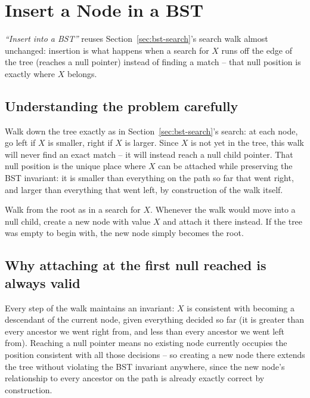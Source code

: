 \section{Insert a Node in a BST}
\label{sec:bst-insert}


\begin{patternbox}
\emph{``Insert into a BST''} reuses Section~\ref{sec:bst-search}'s
search walk almost unchanged: insertion is what happens when a search for
$X$ runs off the edge of the tree (reaches a null pointer) instead of
finding a match -- that null position is exactly where $X$ belongs.
\end{patternbox}

\subsection*{Understanding the problem carefully}

Walk down the tree exactly as in Section~\ref{sec:bst-search}'s search:
at each node, go left if $X$ is smaller, right if $X$ is larger. Since
$X$ is not yet in the tree, this walk will never find an exact match --
it will instead reach a null child pointer. That null position is the
unique place where $X$ can be attached while preserving the BST
invariant: it is smaller than everything on the path so far that went
right, and larger than everything that went left, by construction of the
walk itself.

\begin{ideabox}
Walk from the root as in a search for $X$. Whenever the walk would move
into a null child, create a new node with value $X$ and attach it there
instead. If the tree was empty to begin with, the new node simply becomes
the root.
\end{ideabox}

\subsection*{Why attaching at the first null reached is always valid}

Every step of the walk maintains an invariant: $X$ is consistent with
becoming a descendant of the current node, given everything decided so
far (it is greater than every ancestor we went right from, and less than
every ancestor we went left from). Reaching a null pointer means no
existing node currently occupies the position consistent with all those
decisions -- so creating a new node there extends the tree without
violating the BST invariant anywhere, since the new node's relationship
to every ancestor on the path is already exactly correct by construction.

